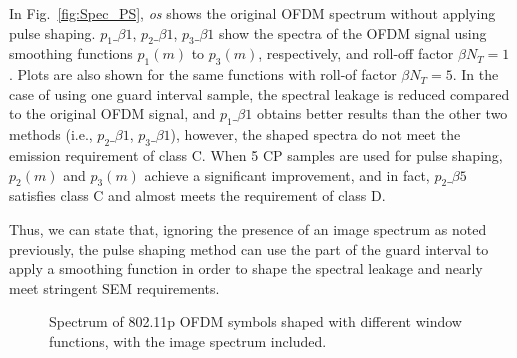 %
In Fig.~\ref{fig:Spec_PS}, \emph{os} shows the original OFDM spectrum without applying pulse shaping.
$p_1\_\beta1$, $p_2\_\beta1$, $p_3\_\beta1$ show the spectra of the OFDM signal using smoothing functions $p_1(m)$ to $p_3(m)$, respectively, and roll-off factor $\beta N_{T}=1$. Plots are also shown for the same functions with roll-of factor $\beta N_{T}=5$.
In the case of using one guard interval sample, the spectral leakage is reduced compared to the original OFDM signal, and  $p_1\_\beta1$ obtains better results than the other two methods (i.e., $p_2\_\beta1$, $p_3\_\beta1$), however, the shaped spectra do not meet the emission requirement of class C.
When 5 CP samples are used for pulse shaping, $p_2(m)$ and $p_3(m)$ achieve a significant improvement, and in fact, $p_2\_\beta5$ satisfies class C and almost meets the requirement of class D.

Thus, we can state that, ignoring the presence of an image spectrum as noted previously, the pulse shaping method can use the part of the guard interval to apply a smoothing function in order to shape the spectral leakage and nearly meet  stringent SEM requirements.

\begin{figure}
	\centering
\caption{Spectrum of 802.11p OFDM symbols shaped with different window functions, with the image spectrum included.}
\label{fig:Inter_Spec_PS}
\vspace{-4mm}
\end{figure}

